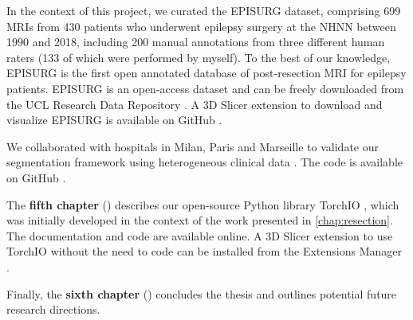 In the context of this project, we curated the EPISURG dataset, comprising 699 \acp{MRI} from 430 patients who underwent epilepsy surgery at the \ac{NHNN} between 1990 and 2018, including 200 manual annotations from three different human raters (133 of which were performed by myself).
To the best of our knowledge, EPISURG is the first open annotated database of post-resection \ac{MRI} for epilepsy patients.
EPISURG is an open-access dataset and can be freely downloaded from the UCL Research Data Repository \cite{perez-garcia_episurg_2020}.
A 3D Slicer extension to download and visualize EPISURG is available on GitHub%
.

We collaborated with hospitals in Milan, Paris and Marseille to validate our segmentation framework using heterogeneous clinical data \cite{perez-garcia_self-supervised_2021}.
The code is available on GitHub%
.

The \textbf{fifth chapter} () describes our open-source Python  library TorchIO \cite{perez-garcia_torchio_2021}, which was initially developed in the context of the work presented in \cref{chap:resection}.
The documentation%
and code%
are available online.
A 3D Slicer extension to use TorchIO without the need to code can be installed from the Extensions Manager%
.


Finally, the \textbf{sixth chapter} () concludes the thesis and outlines potential future research directions.
